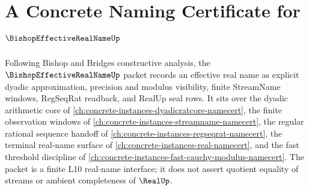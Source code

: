 \chapter{A Concrete Naming Certificate for $\BishopEffectiveRealNameUp$}
\label{ch:concrete-instances-bishop-effective-real-name-namecert}

Following Bishop and Bridges constructive analysis, the $\BishopEffectiveRealNameUp$ packet records an effective real name as explicit dyadic approximation, precision and modulus visibility, finite StreamName windows, RegSeqRat readback, and RealUp seal rows. It sits over the dyadic arithmetic core of \autoref{ch:concrete-instances-dyadicratcore-namecert}, the finite observation windows of \autoref{ch:concrete-instances-streamname-namecert}, the regular rational sequence handoff of \autoref{ch:concrete-instances-regseqrat-namecert}, the terminal real-name surface of \autoref{ch:concrete-instances-real-namecert}, and the fast threshold discipline of \autoref{ch:concrete-instances-fast-cauchy-modulus-namecert}. The packet is a finite L10 real-name interface; it does not assert quotient equality of streams or ambient completeness of $\RealUp$.

